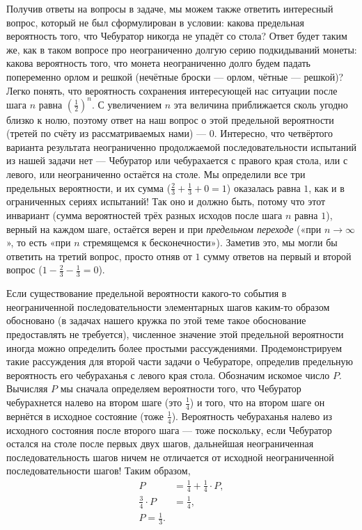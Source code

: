 \documentclass{article}
\begin{document}
Получив ответы на вопросы в задаче, мы можем также ответить интересный вопрос, который не был сформулирован в условии: какова предельная вероятность того, что Чебуратор никогда не упадёт со стола? 
Ответ будет таким же, как в таком вопросе про неограниченно долгую серию подкидываний монеты: 
какова вероятность того, что монета неограниченно долго будем падать попеременно орлом и решкой (нечётные броски --- орлом, чётные --- решкой)? 
Легко понять, что вероятность сохранения интересующей нас ситуации после шага $n$ равна $(\tfrac12)^n$. 
С увеличением $n$ эта величина приближается сколь угодно близко к нолю, поэтому ответ на наш вопрос о этой предельной вероятности (третей по счёту из рассматриваемых нами) --- $0$. 
Интересно, что четвёртого варианта результата неограниченно продолжаемой последовательности испытаний из нашей задачи нет 
--- Чебуратор или чебурахается с правого края стола, 
или с левого, 
или неограниченно остаётся на столе. 
Мы определили все три предельных вероятности, и их сумма ($\tfrac23+\tfrac13+0=1$) оказалась равна $1$, 
как и в ограниченных сериях испытаний! 
Так оно и должно быть, потому что этот инвариант 
(сумма вероятностей трёх разных исходов после шага $n$ равна $1$), верный на каждом шаге, остаётся верен и при \emph{предельном переходе} («при $n\to\infty$», то есть «при $n$ стремящемся к бесконечности»). 
Заметив это, мы могли бы ответить на третий вопрос, просто отняв от $1$ сумму ответов на первый и второй вопрос ($1-\tfrac23-\tfrac13=0$).

Если существование предельной вероятности какого-то события в неограниченной последовательности элементарных шагов каким-то образом обосновано (в задачах нашего кружка по этой теме такое обоснование предоставлять не требуется), численное значение этой предельной вероятности иногда можно определить более простыми рассуждениями. Продемонстрируем такие рассуждения для второй части задачи о Чебураторе, определив предельную вероятность его чебураханья с левого края стола. Обозначим искомое число $P$. 
Вычисляя $P$ мы сначала определяем вероятности того, что Чебуратор чебурахнется налево на втором шаге (это $\tfrac14$) 
и того, что на втором шаге он вернётся в исходное состояние (тоже $\tfrac14$). 
Вероятность чебураханья налево из исходного состояния после второго шага --- тоже  поскольку, если Чебуратор остался на столе после первых двух шагов, дальнейшая неограниченная последовательность шагов ничем не отличается от исходной неограниченной последовательности шагов! Таким образом,
\begin{align*}
P&=\tfrac14+\tfrac14\cdot P,
\\
\tfrac34\cdot P&=\tfrac14,
\\
P=\tfrac13.
\end{align*}
\end{document}
